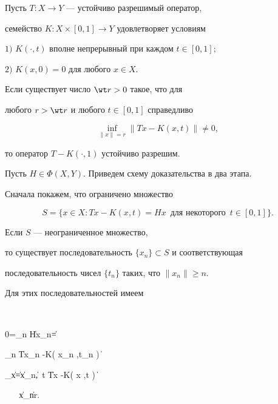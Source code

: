 \begin{thm}


Пусть $T:X\to Y$ --- устойчиво разрешимый оператор,


семейство $K:X\times [0,1] \to Y$ удовлетворяет условиям





$1)$ $K( \cdot ,t)$ вполне непрерывный при каждом $t\in [0,1];$





$2)$ $K( x,0)=0$ для любого $ x\in X $.





Если существует число $\wt r>0$ такое, что для 


любого $r>\wt r$ и любого $t\in [0,1]$ справедливо


$$


\inf_{\| x\|=r} \| Tx-K( x,t)\| \ne 0,


$$


то оператор $T-K( \cdot ,1)$ устойчиво разрешим.


\end{thm}





Пусть $H\in \Phi ( X,Y)$. Приведем схему доказательства в два этапа. 


Сначала покажем, что ограничено множество


$$


S=\{ x\in X : Tx-K( x,t) =Hx\ \; \text{для некоторого}\ \; t\in [0,1]\}.


$$





Если $S$ --- неограниченное множество,


то существует последовательность $\{ x_n\} \subset S$ и соответствующая 


последовательность чисел $\{ t_n\} $ таких, что $\| x_n \| \ge n$. 


Для этих последовательностей имеем


$$


0=\lim_{n\to \infty} \| Hx_n\| =


\lim_{n\to \infty} \| Tx_n -K( x_n ,t_n ) \| \ge


\inf_{\| x\| =\| x_n\|,\ t\in [0,1]} \| Tx -K( x ,t ) \| 


\ \; \ \; \| x_n\| \ge \wt r.


